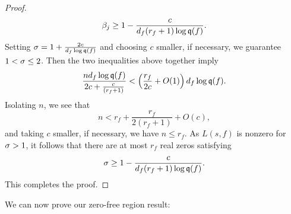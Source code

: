 \begin{proof}
      \[
        \beta_{j} \ge 1-\frac{c}{d_{f}(r_{f}+1)\log{\mathfrak{q}(f)}}.
      \]
      Setting $\sigma = 1+\frac{2c}{d_{f}\log{\mathfrak{q}(f)}}$ and choosing $c$ smaller, if necessary, we guarantee $1 < \sigma \le 2$. Then the two inequalities above together imply
      \[
        \frac{nd_{f}\log{\mathfrak{q}(f)}}{2c+\frac{c}{(r_{f}+1)}} < \left(\frac{r_{f}}{2c}+O(1)\right)d_{f}\log{\mathfrak{q}(f)}.
      \]
      Isolating $n$, we see that
      \[
        n < r_{f}+\frac{r_{f}}{2(r_{f}+1)}+O(c),
      \]
      and taking $c$ smaller, if necessary, we have $n \le r_{f}$. As $L(s,f)$ is nonzero for $\sigma > 1$, it follows that there are at most $r_{f}$ real zeros satisfying
      \[
        \sigma \ge 1-\frac{c}{d_{f}(r_{f}+1)\log{\mathfrak{q}(f)}}.
      \]
      This completes the proof.
    \end{proof}

    We can now prove our zero-free region result:

